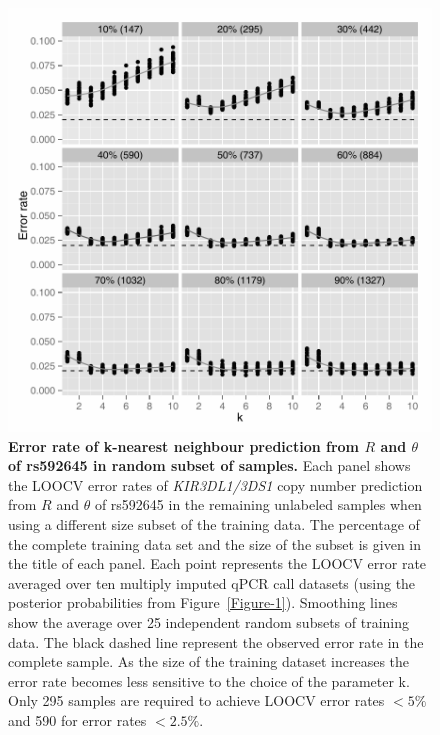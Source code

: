 \begin{figure}[h!]
  \centering
  \includegraphics[scale=.5]{KIR/figures/Figure-4.pdf}
  \caption{ \label{Figure-4}
  \textbf{Error rate of k-nearest neighbour prediction from $R$ and $\theta$ of rs592645 in random subset of samples.}
  Each panel shows the LOOCV error rates of \emph{KIR3DL1/3DS1} copy number prediction
  from $R$ and $\theta$ of rs592645 in the remaining unlabeled samples
  when using a different size subset of the training data.
  The percentage of the complete training data set and the size of the subset is given in the title of each panel.
  Each point represents the LOOCV error rate averaged over ten multiply imputed qPCR call datasets
  (using the posterior probabilities from Figure~\ref{Figure-1}). 
  Smoothing lines show the average over 25 independent random subsets of training data.
  The black dashed line represent the observed error rate in the complete sample.
  As the size of the training dataset increases the error rate becomes less sensitive to the choice of the parameter k.
  Only 295 samples are required to achieve LOOCV error rates $<5\%$ and 590 for error rates $<2.5\%$.}
\end{figure}


